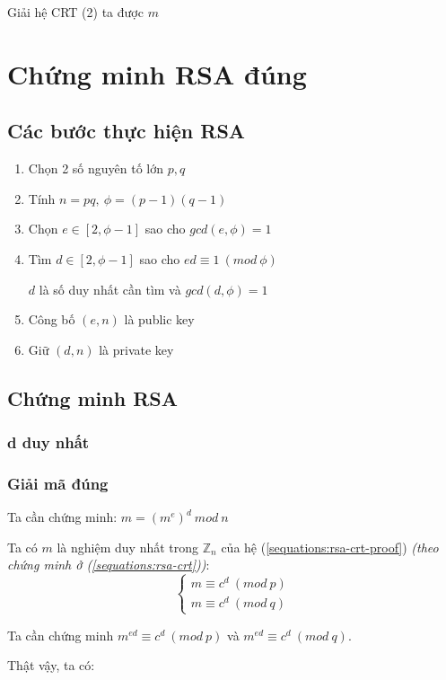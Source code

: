 \documentclass[12pt]{article}
\begin{document}
Giải hệ CRT (2) ta được $m$
\section{Chứng minh RSA đúng}
\subsection{Các bước thực hiện RSA}

\begin{enumerate}[ {(}1{)} ]
        \item Chọn 2 số nguyên tố lớn $p,q$
        \item Tính $n=pq,\ \phi= (p-1)(q-1)$
        \item Chọn $e\in[2, \phi - 1]$ sao cho $gcd(e, \phi) = 1$
        \item Tìm $d \in [2, \phi - 1]$ sao cho $ed \equiv 1\ (mod\ \phi)$

        $d$ là số duy nhất cần tìm và $gcd(d,\phi)=1$
        \item Công bố $(e, n)$ là public key
        \item Giữ $(d, n)$ là private key
\end{enumerate}

\subsection{Chứng minh RSA}
\subsubsection{d duy nhất}
\subsubsection{Giải mã đúng }
Ta cần chứng minh: $m=(m^e)^d\ mod\ n$

Ta có $m$ là nghiệm duy nhất trong $\mathbb{Z}_n$ của hệ (\ref{sequations:rsa-crt-proof}) \textit{(theo chứng minh ở (\ref{sequations:rsa-crt}))}:
\begin{equation}\label{sequations:rsa-crt-proof}
\begin{cases}
m \equiv c^d\ (mod\ p) \\
m \equiv c^d\ (mod\ q)
\end{cases}
\end{equation}

Ta cần chứng minh $m^{ed}\equiv c^d\ (mod\ p)$ và $m^{ed}\equiv c^d\ (mod\ q)$.

Thật vậy, ta có:
\end{document}
